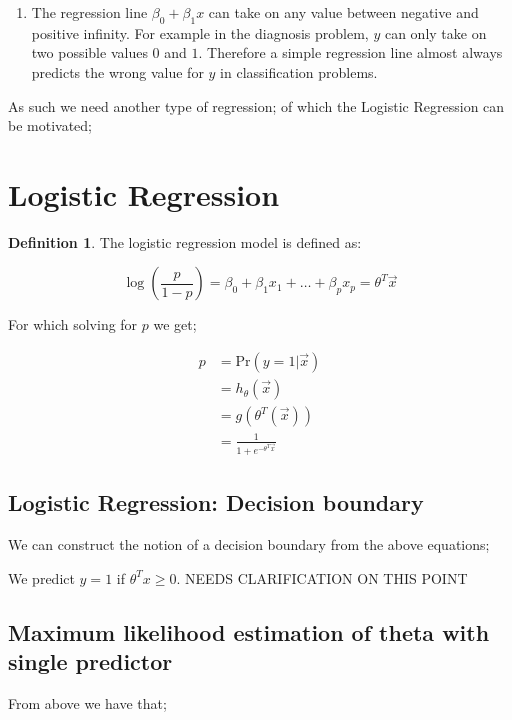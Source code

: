 \documentclass[twoside]{article}
\theoremstyle{definition}
\theoremstyle{definition}
\newtheorem*{proof1}{Definition}
\newenvironment{ddef}{\begin{dBox}\begin{proof1}}{\hfill{\scriptsize}\end{proof1}\end{dBox}}
\begin{document}
\begin{enumerate}
	\item The regression line $\beta_0 + \beta_1 x$ can take on any value between negative and positive infinity. For example in the diagnosis problem, $y$ can only take on two possible values $0$ and $1$. Therefore a simple regression line almost always predicts the wrong value for $y$ in classification problems. 


\end{enumerate}
As such we need another type of regression; of which the Logistic Regression can be motivated;
\section{Logistic Regression}

\begin{ddef}
	The logistic regression model is defined as:

	\begin{equation}
		\log\left( \frac{p}{1-p} \right) = \beta_0 + \beta_1x_1 + \dots + \beta_px_p = \theta^T\vec{x}
	\end{equation} 

	For which solving for $p$ we get;

	\begin{align}
		p & = \text{Pr}(y=1|\vec{x})\\
		& = h_\theta(\vec{x})\\
		& = g(\theta^T(\vec{x}))\\
			& = \frac{1}{1+ e^{-\theta^T \vec{x}}}
	\end{align}
\end{ddef}

\subsection{Logistic Regression: Decision boundary}

We can construct the notion of a decision boundary from the  above equations; 

We predict $y=1$ if $\theta^T x \geq 0$. NEEDS CLARIFICATION ON THIS POINT


\subsection{Maximum likelihood estimation of theta  with single predictor} 

From above we have that;
\end{document}
